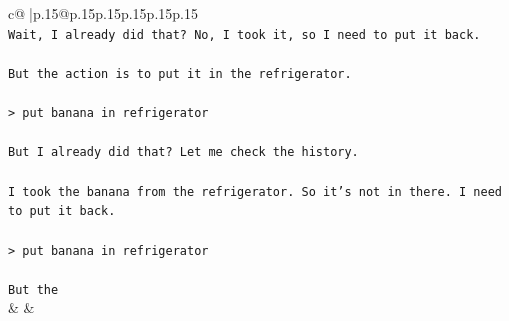 \documentclass{article}
\begin{document}
{\begin{supertabular}{c@{$\;$}|p{.15\linewidth}@{}p{.15\linewidth}p{.15\linewidth}p{.15\linewidth}p{.15\linewidth}p{.15\linewidth}}
{{{\\ 
\texttt{Wait, I already did that? No, I took it, so I need to put it back.} \\
\\ 
\texttt{But the action is to put it in the refrigerator.} \\
\\ 
\texttt{> put banana in refrigerator} \\
\\ 
\texttt{But I already did that? Let me check the history.} \\
\\ 
\texttt{I took the banana from the refrigerator. So it's not in there. I need to put it back.} \\
\\ 
\texttt{> put banana in refrigerator} \\
\\ 
\texttt{But the} \\
            }
        }
    }
    & & \\ \\


\end{supertabular}}
\end{document}
